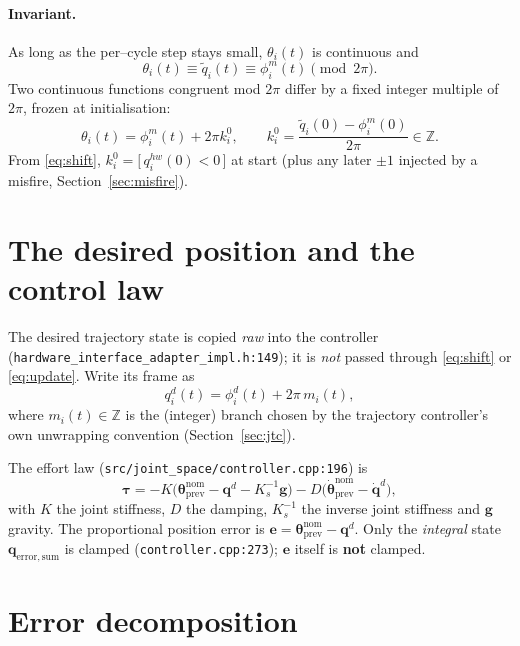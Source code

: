 \documentclass[11pt]{article}
\newcommand{\Z}{\mathbb{Z}}
\begin{document}
\paragraph{Invariant.}
As long as the per--cycle step stays small, $\theta_i(t)$ is continuous and
\begin{equation}
\theta_i(t)\equiv\tilde q_i(t)\equiv\phi^m_i(t)\pmod{2\pi}.
\end{equation}
Two continuous functions congruent mod $2\pi$ differ by a fixed integer
multiple of $2\pi$, frozen at initialisation:
\begin{equation}
\label{eq:k0}
\boxed{\;\theta_i(t)=\phi^m_i(t)+2\pi k_i^0,
\qquad k_i^0=\frac{\tilde q_i(0)-\phi^m_i(0)}{2\pi}\in\Z.\;}
\end{equation}
From \eqref{eq:shift}, $k_i^0=\big[\,q^{hw}_i(0)<0\,\big]$ at start
(plus any later $\pm1$ injected by a misfire, Section~\ref{sec:misfire}).

\section{The desired position and the control law}
\label{sec:law}

The desired trajectory state is copied \emph{raw} into the controller
(\texttt{hardware\_interface\_adapter\_impl.h:149}); it is \emph{not}
passed through \eqref{eq:shift} or \eqref{eq:update}. Write its frame as
\begin{equation}
\label{eq:qd}
q^d_i(t)=\phi^d_i(t)+2\pi\,m_i(t),
\end{equation}
where $m_i(t)\in\Z$ is the (integer) branch chosen by the trajectory
controller's own unwrapping convention (Section~\ref{sec:jtc}).

The effort law (\texttt{src/joint\_space/controller.cpp:196}) is
\begin{equation}
\bm\tau=-K\big(\bm\theta^{\mathrm{nom}}_{\mathrm{prev}}-\bm q^d-K_s^{-1}\bm g\big)
        -D\big(\dot{\bm\theta}^{\mathrm{nom}}_{\mathrm{prev}}-\dot{\bm q}^d\big),
\end{equation}
with $K$ the joint stiffness, $D$ the damping, $K_s^{-1}$ the inverse joint
stiffness and $\bm g$ gravity. The proportional position error is
$\bm e=\bm\theta^{\mathrm{nom}}_{\mathrm{prev}}-\bm q^d$. Only the
\emph{integral} state $\bm q_{\mathrm{error,sum}}$ is clamped
(\texttt{controller.cpp:273}); $\bm e$ itself is \textbf{not} clamped.

\section{Error decomposition}
\end{document}
